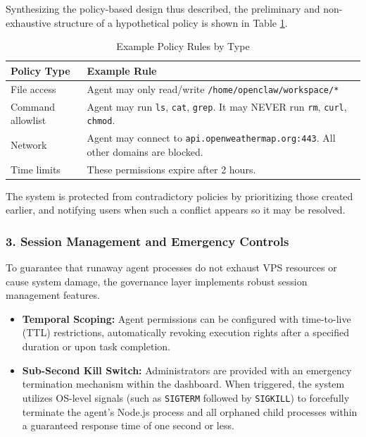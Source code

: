 \documentclass[a4paper]{report}
\begin{document}
Synthesizing the policy-based design thus described, the preliminary and non-exhaustive structure of a hypothetical policy is shown in Table \ref{tab:policy-rules}.
\begin{table}[h]
\centering
\renewcommand{\arraystretch}{1.6}  %
\caption{Example Policy Rules by Type}
\label{tab:policy-rules}
\begin{tabular}{@{}ll@{}}
\toprule
\textbf{Policy Type} & \textbf{Example Rule} \\
\midrule
File access & Agent may only read/write \texttt{/home/openclaw/workspace/*} \\
Command allowlist & Agent may run \texttt{ls}, \texttt{cat}, \texttt{grep}. It may NEVER run \texttt{rm}, \texttt{curl}, \texttt{chmod}. \\
Network & Agent may connect to \texttt{api.openweathermap.org:443}. All other domains are blocked. \\
Time limits & These permissions expire after 2 hours. \\
\bottomrule
\end{tabular}
\end{table}


The system is protected from contradictory policies by prioritizing those created earlier, and notifying users when such a conflict appears so it may be resolved.

\subsubsection*{3. Session Management and Emergency Controls}
To guarantee that runaway agent processes do not exhaust VPS resources or cause system damage, the governance layer implements robust session management features.
\begin{itemize}
    \item \textbf{Temporal Scoping:} Agent permissions can be configured with time-to-live (TTL) restrictions, automatically revoking execution rights after a specified duration or upon task completion.
    \item \textbf{Sub-Second Kill Switch:} Administrators are provided with an emergency termination mechanism within the dashboard. When triggered, the system utilizes OS-level signals (such as \texttt{SIGTERM} followed by \texttt{SIGKILL}) to forcefully terminate the agent's Node.js process and all orphaned child processes within a guaranteed response time of one second or less.
\end{itemize}
\end{document}
